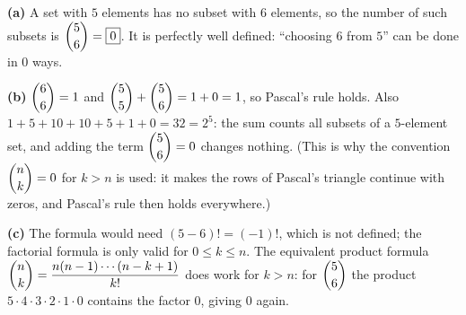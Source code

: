 \textbf{(a)} A set with $5$ elements has no subset with $6$ elements, so the number of such subsets is $\dbinom56=\boxed{0}$. It is perfectly well defined: ``choosing $6$ from $5$'' can be done in $0$ ways.

\textbf{(b)} $\dbinom66=1$ and $\dbinom55+\dbinom56=1+0=1$, so Pascal's rule holds. Also $1+5+10+10+5+1+0=32=2^5$: the sum counts all subsets of a $5$-element set, and adding the term $\dbinom56=0$ changes nothing. (This is why the convention $\dbinom nk=0$ for $k>n$ is used: it makes the rows of Pascal's triangle continue with zeros, and Pascal's rule then holds everywhere.)

\textbf{(c)} The formula would need $(5-6)!=(-1)!$, which is not defined; the factorial formula is only valid for $0\le k\le n$. The equivalent product formula $\dbinom nk=\dfrac{n(n-1)\cdots(n-k+1)}{k!}$ does work for $k>n$: for $\dbinom56$ the product $5\cdot4\cdot3\cdot2\cdot1\cdot0$ contains the factor $0$, giving $0$ again.
